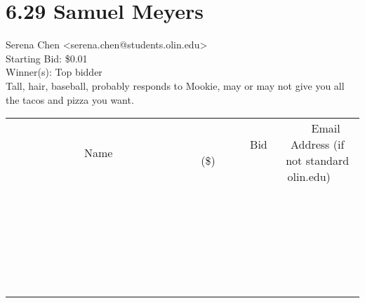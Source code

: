 \documentclass[11pt]{article}
\begin{document}
					\section*{6.29 Samuel Meyers}
					Serena Chen <serena.chen@students.olin.edu> \\
					Starting Bid: \$0.01 \\
					Winner(s): Top bidder \\
					Tall, hair, baseball, probably responds to Mookie, may or may not give you all the tacos and pizza you want. \\
					[6ex]
					\begin{tabular}{c c c}
						~~~~~~~~~~~~~Name~~~~~~~~~~~~~ & ~~~~~~~~~Bid (\$)~~~~~~~~~ & ~~~Email Address (if not standard olin.edu)~~~ \\
				
 & & \\
\hline
 & & \\
\hline
 & & \\
\hline
 & & \\
\hline
 & & \\
\hline
 & & \\
\hline
 & & \\
\hline
 & & \\
\hline
 & & \\
\hline
 & & \\
\hline
 & & \\
\hline
 & & \\
\hline
 & & \\
\hline
 & & \\
\hline
 & & \\
\hline
 & & \\
\hline
 & & \\
\hline
 & & \\
\hline
 & & \\
\hline
 & & \\
\hline
 & & \\
\hline
 & & \\
\hline
 & & \\
\hline
 & & \\
\hline
 & & \\
\hline
 & & \\
\hline
					\end{tabular}
					\clearpage
				
\end{document}
